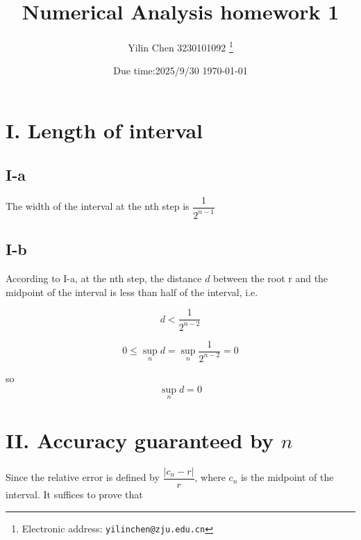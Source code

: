 \documentclass[a4paper]{article}
\begin{document}
\title{Numerical Analysis homework 1}

\author{Yilin Chen 3230101092
  \thanks{Electronic address: \texttt{yilinchen@zju.edu.cn}}}


\date{Due time:2025/9/30 \today}

\maketitle






\section*{I. Length of interval}

\subsection*{I-a}

The width of the interval at the nth step is $\dfrac{1}{2^{n-1}}$

\subsection*{I-b}

According to I-a, at the nth step, the distance $d$ between the root r and the midpoint of the interval is less than half of the interval, i.e.

$$d < \dfrac{1}{2^{n-2}}$$

$$0 \le \sup\limits_{n}d = \sup\limits_{n}\dfrac{1}{2^{n-2}} = 0$$

so $$\sup\limits_{n} d = 0$$

\section*{II. Accuracy guaranteed by $n$}

Since the relative error is defined by $\dfrac{|c_n - r|}r$, where $c_n$ is the midpoint of the interval. It suffices to prove that 
\end{document}
